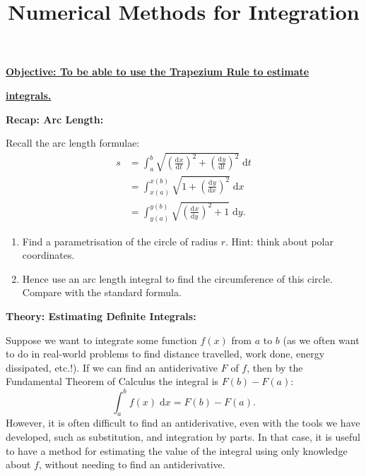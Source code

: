 \documentclass{article}
\newcommand{\deriv}[3][]{\frac{\mathrm{d}^{#1}#2}{\mathrm{d}#3^{#1}}}
\newcommand{\diff}{\;\mathrm{d}}
\begin{document}
\title{Numerical Methods for Integration}
\date{}

\maketitle
\thispagestyle{empty}

\Large

\textbf{\underline{Objective: To be able to use the Trapezium Rule to estimate}}

\textbf{\underline{integrals.}}



\vspace{5mm}



\textbf{Recap: Arc Length:}\bigskip

Recall the arc length formulae:
\begin{align*}
	s&=\int_a^b \sqrt{\left(\deriv{x}{t}\right)^2+\left(\deriv{y}{t}\right)^2}\diff t\\
	&=\int_{x(a)}^{x(b)}\sqrt{1+\left(\deriv{y}{x}\right)^2}\diff x\\
	&=\int_{y(a)}^{y(b)}\sqrt{\left(\deriv{x}{y}\right)^2+1}\diff y.
\end{align*}\medskip


\begin{enumerate}
	\item Find a parametrisation of the circle of radius $r$. Hint: think about polar coordinates.
	\item Hence use an arc length integral to find the circumference of this circle. Compare with the standard formula.
\end{enumerate}





\clearpage














\textbf{Theory: Estimating Definite Integrals:}

\bigskip

Suppose we want to integrate some function $f(x)$ from $a$ to $b$ (as we often want to do in real-world problems to find distance travelled, work done, energy dissipated, etc.!). If we can find an antiderivative $F$ of $f$, then by the Fundamental Theorem of Calculus the integral is $F(b)-F(a)$:
\[\int_a^b f(x)\diff x = F(b)-F(a).\]
However, it is often difficult to find an antiderivative, even with the tools we have developed, such as substitution, and integration by parts. In that case, it is useful to have a method for estimating the value of the integral using only knowledge about $f$, without needing to find an antiderivative.
\end{document}
